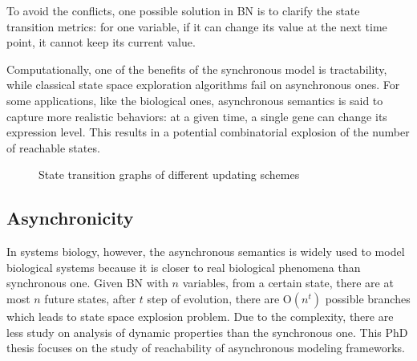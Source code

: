 To avoid the conflicts, one possible solution in BN is to clarify the state transition metrics:
for one variable, if it can change its value at the next time point, it cannot keep its current value.

Computationally, one of the benefits of the synchronous model is tractability, while classical state space exploration algorithms fail on asynchronous ones.
For some applications, like the biological ones, asynchronous semantics is said to capture more realistic behaviors: at a given time, a single gene can change its expression level.
This results in a potential combinatorial explosion of the number of reachable states.

\begin{figure}[ht]
\caption[Update schemes]{State transition graphs of different updating schemes}
\end{figure}
\subsection{Asynchronicity}
In systems biology, however, the asynchronous semantics is widely used to model biological systems because it is closer to real biological phenomena than synchronous one.
Given BN with $n$ variables, from a certain state, there are at most $n$ future states, after $t$ step of evolution, there are O$(n^t)$ possible branches which leads to state space explosion problem.
Due to the complexity, there are less study on analysis of dynamic properties than the synchronous one.
This PhD thesis focuses on the study of reachability of asynchronous modeling frameworks.
